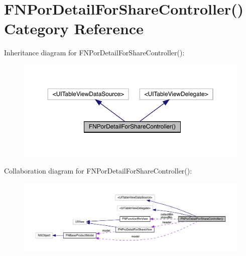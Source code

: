 \hypertarget{category_f_n_por_detail_for_share_controller_07_08}{}\section{F\+N\+Por\+Detail\+For\+Share\+Controller() Category Reference}
\label{category_f_n_por_detail_for_share_controller_07_08}


Inheritance diagram for F\+N\+Por\+Detail\+For\+Share\+Controller()\+:\nopagebreak
\begin{figure}[H]
\begin{center}
\leavevmode
\includegraphics[width=350pt]{category_f_n_por_detail_for_share_controller_07_08__inherit__graph}
\end{center}
\end{figure}


Collaboration diagram for F\+N\+Por\+Detail\+For\+Share\+Controller()\+:\nopagebreak
\begin{figure}[H]
\begin{center}
\leavevmode
\includegraphics[width=350pt]{category_f_n_por_detail_for_share_controller_07_08__coll__graph}
\end{center}
\end{figure}
